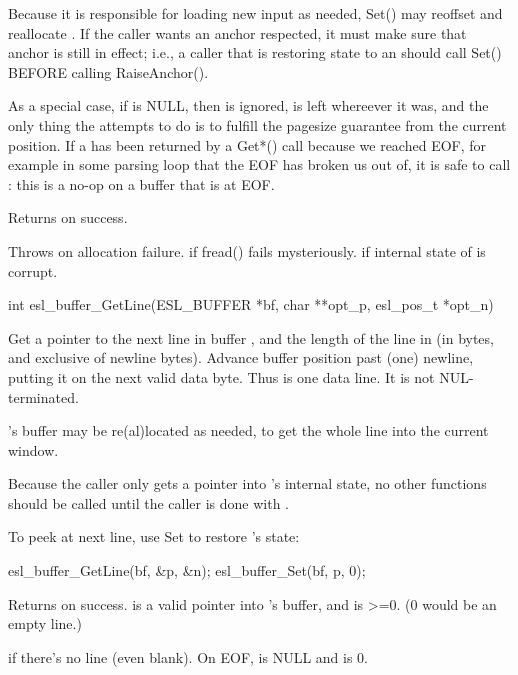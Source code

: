 \begin{sreapi}
Because it is responsible for loading new input as
needed, Set() may reoffset and reallocate . If the
caller wants an anchor respected, it must make sure that
anchor is still in effect; i.e., a caller that is
restoring state to an  should call Set()
BEFORE calling RaiseAnchor().

As a special case, if  is NULL, then  is
ignored,  is left whereever it was, and the
only thing the  attempts to do is to fulfill the
pagesize guarantee from the current position. If a
  has been returned by a Get*() call because we
reached EOF, for example in some parsing loop that the
EOF has broken us out of, it is safe to call
: this is a no-op on a
buffer that is at EOF.

Returns  on success.

Throws  on allocation failure. 
 if fread() fails mysteriously.
 if internal state of  is corrupt.


\hypertarget{func:esl_buffer_GetLine()}
{\item[int esl\_buffer\_GetLine(ESL\_BUFFER *bf, char **opt\_p, esl\_pos\_t *opt\_n)]}

Get a pointer  to the next line in buffer ,
and the length of the line in  (in bytes, and
exclusive of newline bytes). Advance buffer position
past (one) newline, putting it on the next valid data
byte. Thus  is one data line. It is not
NUL-terminated.

's buffer may be re(al)located as needed, to get
the whole line into the current window.

Because the caller only gets a pointer into 's 
internal state, no other  functions 
should be called until the caller is done with .

To peek at next line, use Set to restore 's state:
\begin{cchunk}
esl_buffer_GetLine(bf, &p, &n);
esl_buffer_Set(bf, p, 0);           
\end{cchunk}

Returns  on success.   is a valid pointer into 's buffer,
and  is >=0. (0 would be an empty line.)

 if there's no line (even blank).
On EOF,  is NULL and  is 0.


\end{sreapi}
